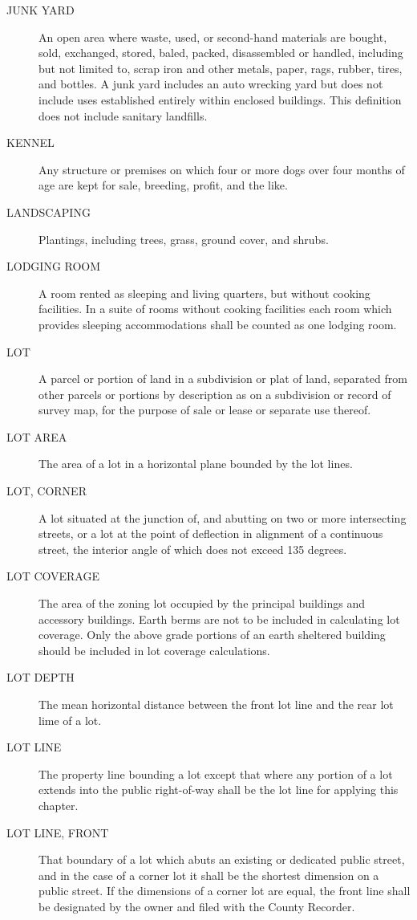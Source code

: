 \begin{description}
    \item[JUNK YARD] An open area where waste, used, or second-hand materials are bought, sold, exchanged, stored, baled, packed, disassembled or handled, including but not limited to, scrap iron and other metals, paper, rags, rubber, tires, and bottles.  A junk yard includes an auto wrecking yard but does not include uses established entirely within enclosed buildings.  This definition does not include sanitary landfills.
    \item[KENNEL] Any structure or premises on which four or more dogs over four months of age are kept for sale, breeding, profit, and the like.
    \item[LANDSCAPING] Plantings, including trees, grass, ground cover, and shrubs.
    \item[LODGING ROOM] A room rented as sleeping and living quarters, but without cooking facilities. In a suite of rooms without cooking facilities each room which provides sleeping accommodations shall be counted as one lodging room.
    \item[LOT] A parcel or portion of land in a subdivision or plat of land, separated from other parcels or portions by description as on a subdivision or record of survey map, for the purpose of sale or lease or separate use thereof.
    \item[LOT AREA] The area of a lot in a horizontal plane bounded by the lot lines.
    \item[LOT, CORNER] A lot situated at the junction of, and abutting on two or more intersecting streets, or a lot at the point of deflection in alignment of a continuous street, the interior angle of which does not exceed 135 degrees.
    \item[LOT COVERAGE]The area of the zoning lot occupied by the principal buildings and accessory buildings. Earth berms are not to be included in calculating lot coverage.  Only the above grade portions of an earth sheltered building should be included in lot coverage calculations.
    \item[LOT DEPTH] The mean horizontal distance between the front lot line and the rear lot lime of a lot.
    \item[LOT LINE] The property line bounding a lot except that where any portion of a lot extends into the public right-of-way shall be the lot line for applying this chapter.
    \item[LOT LINE, FRONT] That boundary of a lot which abuts an existing or dedicated public street, and in the case of a corner lot it shall be the shortest dimension on a public street. If the dimensions of a corner lot are equal, the front line shall be designated by the owner and filed with the County Recorder.

\end{description}
